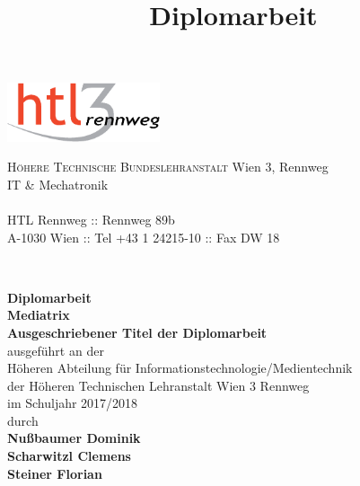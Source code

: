 \documentclass[
    headings=optiontotocandhead,%
    twoside,
    numbers=noenddot,%
    toc=flat, %
    12pt, %
    titlepage, %
    parskip=full, %
    listof=totoc, %
    listof=flat, %
    numbers=noenddot, %
    bibliography=totoc, %
    a4paper,DIV=14,
    BCOR=15mm,
]{scrbook}
\begin{document}
\newcommand{\kapitelautor}{}


\frontmatter %
\title{Diplomarbeit}
\begin{titlepage}
\begin{minipage}[b]{1\columnwidth}
\parbox[b]{50mm}{\includegraphics[width=45mm]{HTL3RLogoRGB}}
\hfill
\parbox[b]{130mm}{\footnotesize \textsc{Höhere Technische Bundeslehranstalt} Wien 3, Rennweg\\
IT \& Mechatronik\\
\\
HTL Rennweg :: Rennweg 89b\\
A-1030 Wien :: Tel +43 1 24215-10 :: Fax DW 18
}\\
\mbox{}
\end{minipage}

\vspace{1cm}


\begin{center}
\textbf{\LARGE{Diplomarbeit}}{\large{}}\\
{\large{}\vspace{15mm}
 }\textbf{\large{Mediatrix}}\\
\textbf{\large{Ausgeschriebener Titel der Diplomarbeit}}\\
 \vspace{15mm}
 ausgeführt an der\\
 Höheren Abteilung für Informationstechnologie/Medientechnik\\
 der Höheren Technischen Lehranstalt Wien 3 Rennweg\\
 \vspace{1cm}
 im Schuljahr 2017/2018\\
 \vspace{1cm}
 durch\\
 \vspace{0.5cm}
\textbf{\large{}Nußbaumer Dominik}\\
\textbf{\large{}Scharwitzl Clemens}\\
\textbf{\large{}Steiner Florian}\\


\end{center}
\end{titlepage}
\end{document}
